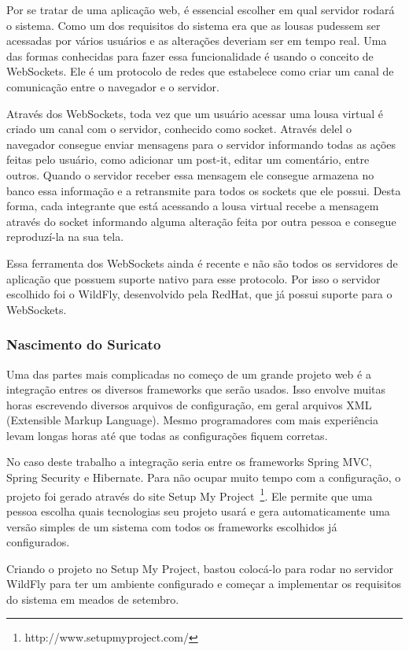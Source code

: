Por se tratar de uma aplicação web, é essencial escolher em qual servidor rodará o sistema. Como um dos requisitos do sistema era que as lousas pudessem ser acessadas por vários usuários e as alterações deveriam ser em tempo real. Uma das formas conhecidas para fazer essa funcionalidade é usando o conceito de WebSockets. Ele é um protocolo de redes que estabelece como criar um canal de comunicação entre o navegador e o servidor.

Através dos WebSockets, toda vez que um usuário acessar uma lousa virtual é criado um canal com o servidor, conhecido como socket. Através delel o navegador consegue enviar mensagens para o servidor informando todas as ações feitas pelo usuário, como adicionar um post-it, editar um comentário, entre outros. Quando o servidor receber essa mensagem ele consegue armazena no banco essa informação e a retransmite para todos os sockets que ele possui. Desta forma, cada integrante que está acessando a lousa virtual recebe a mensagem através do socket informando alguma alteração feita por outra pessoa e consegue reproduzí-la na sua tela.

Essa ferramenta dos WebSockets ainda é recente e não são todos os servidores de aplicação que possuem suporte nativo para esse protocolo. Por isso o servidor escolhido foi o WildFly, desenvolvido pela RedHat, que já possui suporte para o WebSockets.

\subsubsection*{Nascimento do Suricato}

Uma das partes mais complicadas no começo de um grande projeto web é a integração entres os diversos frameworks que serão usados. Isso envolve muitas horas escrevendo diversos arquivos de configuração, em geral arquivos XML (Extensible Markup Language). Mesmo programadores com mais experiência levam longas horas até que todas as configurações fiquem corretas. 
	
No caso deste trabalho a integração seria entre os frameworks Spring MVC, Spring Security e Hibernate. Para não ocupar muito tempo com a configuração, o projeto foi gerado através do site Setup My Project~\footnote{http://www.setupmyproject.com/}. Ele permite que uma pessoa escolha quais tecnologias seu projeto usará e gera automaticamente uma versão simples de um sistema com todos os frameworks escolhidos já configurados.

Criando o projeto no Setup My Project, bastou colocá-lo para rodar no servidor WildFly para ter um ambiente configurado e começar a implementar os requisitos do sistema em meados de setembro.


